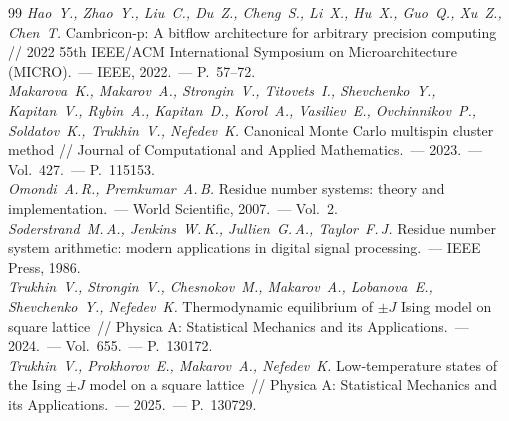 \documentclass{crm-article}
\begin{document}
\begin{thebibliography}{99}
{\it Hao~Y., Zhao~Y., Liu~C., Du~Z., Cheng~S., Li~X., Hu~X., Guo~Q., Xu~Z., Chen~T.} Cambricon-p: A bitflow architecture for arbitrary precision computing // 2022 55th IEEE/ACM International Symposium on Microarchitecture (MICRO).~--- IEEE, 2022.~--- P.~57--72.\\

 {\it Makarova~K., Makarov~A., Strongin~V., Titovets~I., Shevchenko~Y., Kapitan~V., Rybin~A., Kapitan~D., Korol~A., Vasiliev~E., Ovchinnikov~P., Soldatov~K., Trukhin~V., Nefedev~K.} Canonical Monte Carlo multispin cluster method // Journal of Computational and Applied Mathematics.~--- 2023.~--- Vol.~427.~--- P.~115153.\\

 {\it Omondi~A.\,R., Premkumar~A.\,B.} Residue number systems: theory and implementation.~--- World Scientific, 2007.~--- Vol.~2.\\

 {\it Soderstrand~M.\,A., Jenkins~W.\,K., Jullien~G.\,A., Taylor~F.\,J.} Residue number system arithmetic: modern applications in digital signal processing.~--- IEEE Press, 1986.\\

 {\it Trukhin~V., Strongin~V., Chesnokov~M., Makarov~A., Lobanova~E., Shevchenko~Y., Nefedev~K.} Thermodynamic equilibrium of $\pm J$ Ising model on square lattice~// Physica A: Statistical Mechanics and its
Applications.~--- 2024.~--- Vol.~655.~--- P.~130172.\\

 {\it Trukhin~V., Prokhorov~E., Makarov~A., Nefedev~K.} Low-temperature states of the Ising $\pm J$ model on a square lattice~// Physica A: Statistical Mechanics and its Applications.~--- 2025.~--- P.~130729.\\

\end{thebibliography}
\end{document}
